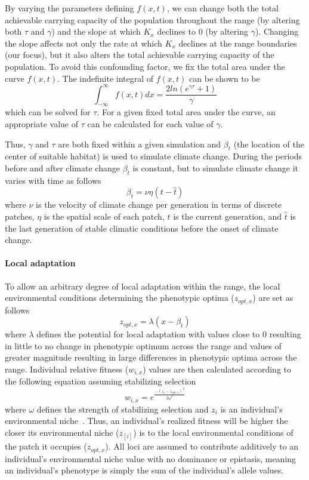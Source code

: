 \documentclass[12pt, oneside]{article}
\begin{document}
By varying the parameters defining $f(x,t)$, we can change both the total achievable carrying capacity of the population throughout the range (by altering both $\tau$ and $\gamma$) and the slope at which $K_{x}$ declines to $0$ (by altering $\gamma$). Changing the slope affects not only the rate at which $K_{x}$ declines at the range boundaries (our focus), but it also alters the total achievable carrying capacity of the population. To avoid this confounding factor, we fix the total area under the curve $f(x,t)$. The indefinite integral of $f(x,t)$ can be shown to be
\begin{equation}
\int_{-\infty}^{\infty}f(x,t)dx = \frac{2ln(e^{\gamma\tau}+1)}{\gamma}
\end{equation}
which can be solved for $\tau$. For a given fixed total area under the curve, an appropriate value of $\tau$ can be calculated for each value of $\gamma$.

Thus, $\gamma$ and $\tau$ are both fixed within a given simulation and $\beta_{t}$ (the location of the center of suitable habitat) is used to simulate climate change. During the periods before and after climate change $\beta_{t}$ is constant, but to simulate climate change it varies with time as follows
\begin{equation}
\beta_{t}=\nu\eta(t-\hat{t})
\end{equation}
where $\nu$ is the velocity of climate change per generation in terms of discrete patches, $\eta$ is the spatial scale of each patch, $t$ is the current generation, and $\hat{t}$ is the last generation of stable climatic conditions before the onset of climate change.

\paragraph{Local adaptation}
To allow an arbitrary degree of local adaptation within the range, the local environmental conditions determining the phenotypic optima ($z_{opt,x}$) are set as follows
\begin{equation}
z_{opt,x}=\lambda(x-\beta_{t})
\end{equation}
where $\lambda$ defines the potential for local adaptation with values close to $0$ resulting in little to no change in phenotypic optimum across the range and values of greater magnitude resulting in large differences in phenotypic optima across the range. Individual relative fitness ($w_{i,x}$) values are then calculated according to the following equation assuming stabilizing selection
\begin{equation}
w_{i,x}=e^{\frac{-(z_{i}-z_{opt,x})^{2}}{2\omega^{2}}}
\end{equation}
where $\omega$ defines the strength of stabilizing selection and $z_{i}$ is an individual's environmental niche~\citep{lande1976natural}. Thus, an individual's realized fitness will be higher the closer its environmental niche ($z_[i]$) is to the local environmental conditions of the patch it occupies ($z_{opt,x}$). All loci are assumed to contribute additively to an individual's environmental niche value with no dominance or epistasis, meaning an individual's phenotype is simply the sum of the individual's allele values.
\end{document}

